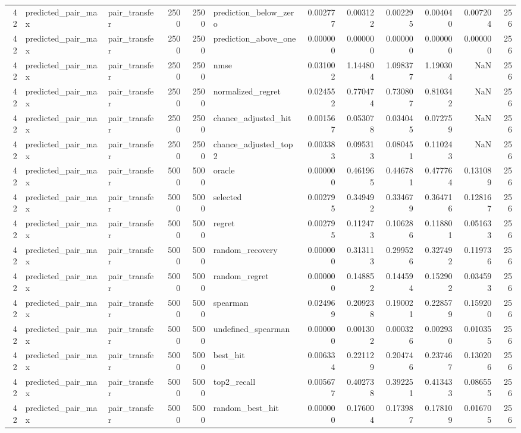 \begin{tabular}{rllrrlrrrrrr}
42 & predicted_pair_max & pair_transfer & 2500 & 2500 & prediction_below_zero & 0.002777 & 0.003122 & 0.002295 & 0.004040 & 0.007204 & 256 \\
42 & predicted_pair_max & pair_transfer & 2500 & 2500 & prediction_above_one & 0.000000 & 0.000000 & 0.000000 & 0.000000 & 0.000000 & 256 \\
42 & predicted_pair_max & pair_transfer & 2500 & 2500 & nmse & 0.031002 & 1.144804 & 1.098377 & 1.190304 & NaN & 256 \\
42 & predicted_pair_max & pair_transfer & 2500 & 2500 & normalized_regret & 0.024552 & 0.770474 & 0.730807 & 0.810342 & NaN & 256 \\
42 & predicted_pair_max & pair_transfer & 2500 & 2500 & chance_adjusted_hit & 0.001567 & 0.053078 & 0.034045 & 0.072759 & NaN & 256 \\
42 & predicted_pair_max & pair_transfer & 2500 & 2500 & chance_adjusted_top2 & 0.003383 & 0.095313 & 0.080451 & 0.110243 & NaN & 256 \\
42 & predicted_pair_max & pair_transfer & 5000 & 5000 & oracle & 0.000000 & 0.461965 & 0.446781 & 0.477764 & 0.131089 & 256 \\
42 & predicted_pair_max & pair_transfer & 5000 & 5000 & selected & 0.002795 & 0.349492 & 0.334679 & 0.364716 & 0.128167 & 256 \\
42 & predicted_pair_max & pair_transfer & 5000 & 5000 & regret & 0.002795 & 0.112473 & 0.106286 & 0.118801 & 0.051633 & 256 \\
42 & predicted_pair_max & pair_transfer & 5000 & 5000 & random_recovery & 0.000000 & 0.313113 & 0.299526 & 0.327492 & 0.119736 & 256 \\
42 & predicted_pair_max & pair_transfer & 5000 & 5000 & random_regret & 0.000000 & 0.148852 & 0.144594 & 0.152902 & 0.034593 & 256 \\
42 & predicted_pair_max & pair_transfer & 5000 & 5000 & spearman & 0.024969 & 0.209238 & 0.190021 & 0.228579 & 0.159200 & 256 \\
42 & predicted_pair_max & pair_transfer & 5000 & 5000 & undefined_spearman & 0.000000 & 0.001302 & 0.000326 & 0.002930 & 0.010355 & 256 \\
42 & predicted_pair_max & pair_transfer & 5000 & 5000 & best_hit & 0.006334 & 0.221129 & 0.204746 & 0.237467 & 0.130206 & 256 \\
42 & predicted_pair_max & pair_transfer & 5000 & 5000 & top2_recall & 0.005677 & 0.402738 & 0.392251 & 0.413433 & 0.086555 & 256 \\
42 & predicted_pair_max & pair_transfer & 5000 & 5000 & random_best_hit & 0.000000 & 0.176004 & 0.173987 & 0.178109 & 0.016705 & 256 \\

\end{tabular}
